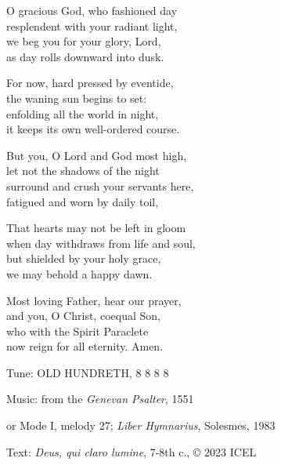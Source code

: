 \hymn

\begin{hymnverse}
O gracious God, who fashioned day\\
resplendent with your radiant light,\\
we beg you for your glory, Lord,\\
as day rolls downward into dusk.

For now, hard pressed by eventide,\\
the waning sun begins to set:\\
enfolding all the world in night,\\
it keeps its own well-ordered course.

But you, O Lord and God most high,\\
let not the shadows of the night\\
surround and crush your servants here,\\
fatigued and worn by daily toil,

That hearts may not be left in gloom\\
when day withdraws from life and soul,\\
but shielded by your holy grace,\\
we may behold a happy dawn.

Most loving Father, hear our prayer,\\
and you, O Christ, coequal Son,\\
who with the Spirit Paraclete\\
now reign for all eternity. Amen.
\end{hymnverse}

\begin{hymnsource}
Tune: OLD HUNDRETH, 8 8 8 8

Music: from the \emph{Genevan Psalter}, 1551

or Mode I, melody 27; \emph{Liber Hymnarius}, Solesmes, 1983

Text: \emph{Deus, qui claro lumine}, 7-8th c., © 2023 ICEL
\end{hymnsource}